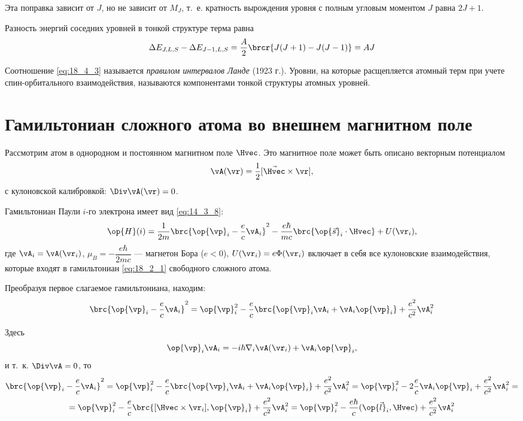 Эта поправка зависит от $J$, но не зависит от $M_J$, т.~е. кратность вырождения уровня с полным угловым моментом $J$ равна $2J+1$.

Разность энергий соседних уровней в тонкой структуре терма равна
\begin{equation}
\label{eq:18_4_3}
\Delta E_{J,L,S} - \Delta E_{J-1, L, S} = \frac{A}{2}\brcr{J(J+1) - J(J-1)} = AJ
\end{equation}

Соотношение \eqref{eq:18_4_3} называется {\em правилом интервалов Ланде} (1923 г.). Уровни, на которые расщепляется атомный терм при учете спин-орбитального взаимодействия, называются компонентами тонкой структуры атомных уровней.

\section{Гамильтониан сложного атома во внешнем магнитном поле}

Рассмотрим атом в однородном и постоянном магнитном поле $\Hvec$. Это магнитное поле может быть описано векторным потенциалом
$$
\vA(\vr) = \frac{1}{2}[\vec{\Hvec} \times \vr],
$$
с кулоновской калибровкой: $\Div \vA(\vr) = 0$.

Гамильтониан Паули $i$-го электрона имеет вид \eqref{eq:14_3_8}:
\begin{equation}
\label{eq:18_5_1}
\op{H}(i) = \frac{1}{2m}\brc{\op{\vp}_i - \frac{e}{c}\vA_i}^2 - \frac{e\hbar}{mc}\brc{\op{\vec{s}}_i \cdot \Hvec} + U(\vr_i),
\end{equation}
где $\vA_i = \vA(\vr_i)$, $\mu_B = -\dfrac{e\hbar}{2mc}$ --- магнетон Бора ($e < 0$), $U(\vr_i) = e\Phi(\vr_i)$ включает в себя все кулоновские взаимодействия, которые входят в гамильтониан \eqref{eq:18_2_1} свободного сложного атома.

Преобразуя первое слагаемое гамильтониана, находим:
\begin{gather*}
\brc{\op{\vp}_i - \frac{e}{c}\vA_i}^2 = \op{\vp}_i^2 - \frac{e}{c}\brc{\op{\vp}_i \vA_i + \vA_i \op{\vp}_i} + \frac{e^2}{c^2}\vA_i^2 
\end{gather*}

Здесь
$$
\op{\vp}_i \vA_i = -i\hbar \nabla_i \vA(\vr_i) + \vA_i \op{\vp}_i,
$$
и т.~к. $\Div \vA = 0$, то
\begin{gather*}
\brc{\op{\vp}_i - \frac{e}{c}\vA_i}^2 = \op{\vp}_i^2 - \frac{e}{c}\brc{\op{\vp}_i \vA_i + \vA_i \op{\vp}_i} + \frac{e^2}{c^2}\vA_i^2 = \op{\vp}_i^2 - 2\frac{e}{c}\vA_i \op{\vp}_i + \frac{e^2}{c^2}\vA_i^2 = \\
= \op{\vp}_i^2 - \frac{e}{c}\brc{[\Hvec \times \vr_i], \op{\vp}_i} + \frac{e^2}{c^2}\vA_i^2 = \op{\vp}_i^2 - \frac{e\hbar}{c}(\op{\vec{l}}_i, \Hvec) + \frac{e^2}{c^2}\vA_i^2
\end{gather*}

